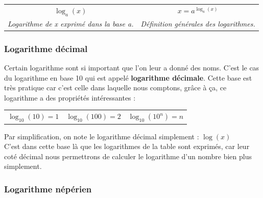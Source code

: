 \documentclass[a4paper]{article}
\begin{document}
\begin{center}
\begin{tabular}{c|c}

{\huge $ \log_{a}(x) $}                          & {\huge $x = a ^{ \log_{a} (x)}$} \\
\textit{Logarithme de x exprimé dans la base a.} & \textit{Définition générales des logarithmes.}\\

\end{tabular}
\end{center}

\vspace{0.2cm}

\subsubsection*{Logarithme décimal}

	Certain logarithme sont si important que l'on leur a donné des noms. C'est le cas du logarithme en base 10 qui est appelé \textbf{logarithme décimale}. Cette base est très pratique car c'est celle dans laquelle nous comptons, grâce à ça, ce logarithme a des propriétés intéressantes :	
	
	\begin{center}
	
	\begin{large}
	\begin{tabular}{c|c|c}
		$ \log_{10} (10) = 1 $ \hspace{1cm} &
		\hspace{1cm} $ \log_{10} (100) = 2 $ \hspace{1cm} &
		\hspace{1cm} $ \log_{10} (10^{n}) = n $ \\
	\end{tabular}
	\end{large}
	\end{center}

	Par simplification, on note le logarithme décimal simplement : {\large $ \log(x) $}\\
	
	C'est dans cette base là que les logarithmes de la table sont exprimés, car leur coté décimal nous permettrons de calculer le logarithme d'un nombre bien plus simplement.

\subsubsection*{Logarithme népérien}
\end{document}
